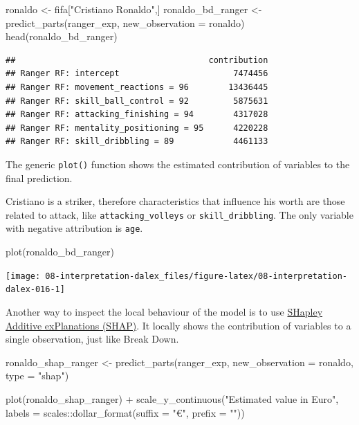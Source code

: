 \documentclass[
]{scrbook}
\newenvironment{Shaded}{\begin{snugshade}}{\end{snugshade}}
\newcommand{\AttributeTok}[1]{\textcolor[rgb]{0.77,0.63,0.00}{#1}}
\newcommand{\FunctionTok}[1]{\textcolor[rgb]{0.00,0.00,0.00}{#1}}
\newcommand{\NormalTok}[1]{#1}
\newcommand{\OtherTok}[1]{\textcolor[rgb]{0.56,0.35,0.01}{#1}}
\newcommand{\SpecialCharTok}[1]{\textcolor[rgb]{0.00,0.00,0.00}{#1}}
\newcommand{\StringTok}[1]{\textcolor[rgb]{0.31,0.60,0.02}{#1}}
\renewenvironment{Shaded} {\begin{snugshade}\small} {\end{snugshade}}
\begin{document}
\begin{Shaded}
\begin{Highlighting}[]
\NormalTok{ronaldo }\OtherTok{\textless{}{-}}\NormalTok{ fifa[}\StringTok{"Cristiano Ronaldo"}\NormalTok{,]}
\NormalTok{ronaldo\_bd\_ranger }\OtherTok{\textless{}{-}} \FunctionTok{predict\_parts}\NormalTok{(ranger\_exp,}
                        \AttributeTok{new\_observation =}\NormalTok{ ronaldo)}
\FunctionTok{head}\NormalTok{(ronaldo\_bd\_ranger)}
\end{Highlighting}
\end{Shaded}

\begin{verbatim}
##                                       contribution
## Ranger RF: intercept                       7474456
## Ranger RF: movement_reactions = 96        13436445
## Ranger RF: skill_ball_control = 92         5875631
## Ranger RF: attacking_finishing = 94        4317028
## Ranger RF: mentality_positioning = 95      4220228
## Ranger RF: skill_dribbling = 89            4461133
\end{verbatim}

The generic \texttt{plot()} function shows the estimated contribution of variables to the final prediction.

Cristiano is a striker, therefore characteristics that influence his worth are those related to attack, like \texttt{attacking\_volleys} or \texttt{skill\_dribbling}. The only variable with negative attribution is \texttt{age}.

\begin{Shaded}
\begin{Highlighting}[]
\FunctionTok{plot}\NormalTok{(ronaldo\_bd\_ranger)}
\end{Highlighting}
\end{Shaded}

\begin{center}\texttt{[image: 08-interpretation-dalex\_files/figure-latex/08-interpretation-dalex-016-1]} \end{center}

Another way to inspect the local behaviour of the model is to use \href{https://pbiecek.github.io/ema/shapley.html}{SHapley Additive exPlanations (SHAP)}. It locally shows the contribution of variables to a single observation, just like Break Down.

\begin{Shaded}
\begin{Highlighting}[]
\NormalTok{ronaldo\_shap\_ranger }\OtherTok{\textless{}{-}} \FunctionTok{predict\_parts}\NormalTok{(ranger\_exp,}
                        \AttributeTok{new\_observation =}\NormalTok{ ronaldo,}
                        \AttributeTok{type =} \StringTok{"shap"}\NormalTok{)}

\FunctionTok{plot}\NormalTok{(ronaldo\_shap\_ranger) }\SpecialCharTok{+}
  \FunctionTok{scale\_y\_continuous}\NormalTok{(}\StringTok{"Estimated value in Euro"}\NormalTok{, }\AttributeTok{labels =}\NormalTok{ scales}\SpecialCharTok{::}\FunctionTok{dollar\_format}\NormalTok{(}\AttributeTok{suffix =} \StringTok{"€"}\NormalTok{, }\AttributeTok{prefix =} \StringTok{""}\NormalTok{))}
\end{Highlighting}
\end{Shaded}
\end{document}
